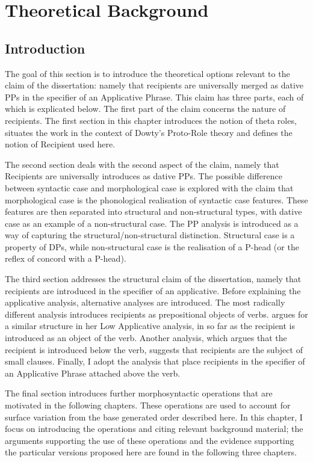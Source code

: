 \chapter{Theoretical Background}
\label{ch:theoryback}
\section{Introduction}
The goal of this section is to introduce the theoretical options relevant to the claim of the dissertation: namely that recipients are universally merged as dative PPs in the specifier of an Applicative Phrase. This claim has three parts, each of which is explicated below. The first part of the claim concerns the nature of recipients. The first section in this chapter introduces the notion of theta roles, situates the work in the context of Dowty's Proto-Role theory and defines the notion of Recipient used here.

The second section deals with the second aspect of the claim, namely that Recipients are universally introduces as dative PPs. The possible difference between syntactic case and morphological case is explored with the claim that morphological case is the phonological realisation of syntactic case features. These features are then separated into structural and non-structural types, with dative case as an example of a non-structural case. The PP analysis is introduced as a way of capturing the structural/non-structural distinction. Structural case is a property of DPs, while non-structural case is the realisation of a P-head (or the reflex of concord with a P-head).

The third section addresses the structural claim of the dissertation, namely that recipients are introduced in the specifier of an applicative. Before explaining the applicative analysis, alternative analyses are introduced. The most radically different analysis introduces recipients as prepositional objects of verbs. \cite{Pylkkanen.2001} argues for a similar structure in her Low Applicative analysis, in so far as the recipient is introduced as an object of the verb. Another analysis, which argues that the recipient is introduced below the verb, suggests that recipients are the subject of small clauses. Finally, I adopt the analysis that place recipients in the specifier of an Applicative Phrase attached above the verb.

The final section introduces further morphosyntactic operations that are motivated in the following chapters. These operations are used to account for surface variation from the base generated order described here. In this chapter, I focus on introducing the operations and citing relevant background material; the arguments supporting the use of these operations and the evidence supporting the particular versions proposed here are found in the following three chapters. 

